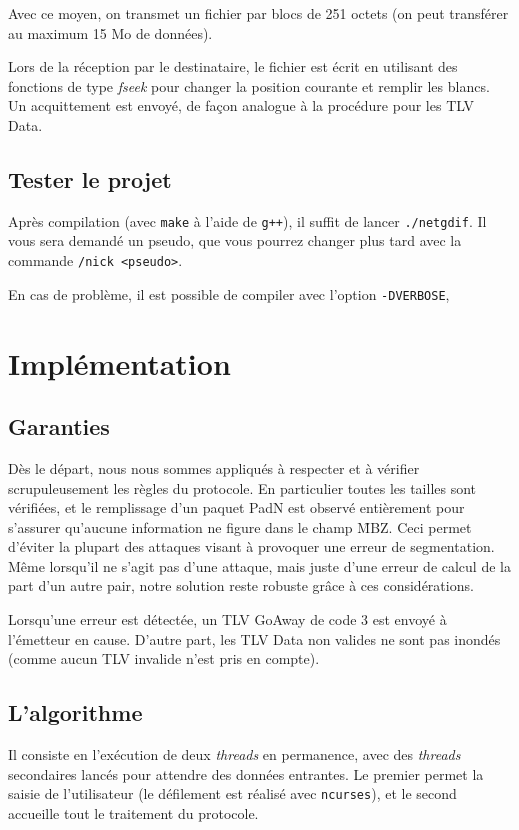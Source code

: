 \documentclass[11pt,a4paper]{article}
\begin{document}
Avec ce moyen, on transmet un fichier par blocs de 251 octets (on peut transférer au maximum 15 Mo de données). 

Lors de la réception par le destinataire, le fichier est écrit en utilisant des fonctions de type \emph{fseek} pour changer la position courante et remplir
les blancs. Un acquittement est envoyé, de façon analogue à la procédure pour les TLV Data.

\subsection{Tester le projet}

Après compilation (avec \texttt{make} à l'aide de \texttt{g++}), il suffit de lancer \texttt{./netgdif}. Il vous sera demandé un pseudo, que vous pourrez changer
plus tard avec la commande \texttt{/nick <pseudo>}. 

En cas de problème, il est possible de compiler avec l'option \texttt{-DVERBOSE}, 

\section{Implémentation}

\subsection{Garanties}

Dès le départ, nous nous sommes appliqués à respecter et à vérifier scrupuleusement les règles du protocole. En particulier toutes les tailles sont vérifiées, et le remplissage
d'un paquet PadN est observé entièrement pour s'assurer qu'aucune information ne figure dans le champ \f{MBZ}. Ceci permet d'éviter la plupart des attaques visant à provoquer 
une erreur de segmentation. Même lorsqu'il ne s'agit pas d'une attaque, mais juste d'une erreur de calcul de la part d'un autre pair, notre solution reste robuste grâce à
ces considérations.

Lorsqu'une erreur est détectée, un TLV GoAway de code 3 est envoyé à l'émetteur en cause. D'autre part, les TLV Data non valides ne sont pas inondés (comme aucun TLV invalide 
n'est pris en compte).

\subsection{L'algorithme}
	
	Il consiste en l'exécution de deux \emph{threads} en permanence, avec des \emph{threads} secondaires lancés pour attendre des données entrantes.
	Le premier permet la saisie de l'utilisateur (le défilement est réalisé avec \texttt{ncurses}), et le second accueille tout le traitement du protocole.
	
\end{document}
